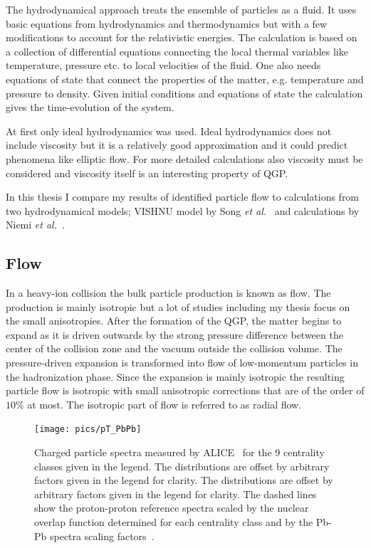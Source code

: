 
The hydrodynamical approach treats the ensemble of particles as a fluid. It uses  basic equations from hydrodynamics and thermodynamics but with a few modifications to account for the relativistic energies. The calculation is based on a collection of differential equations connecting the local thermal variables like temperature, pressure etc. to local velocities of the fluid. One also needs equations of state that connect the properties of the matter, e.g. temperature and pressure to density.  Given initial conditions and equations of state the calculation gives the time-evolution of the system.

At first only ideal hydrodynamics was used. Ideal hydrodynamics does not include viscosity but it is a relatively good approximation and it could predict phenomena like elliptic flow. For more detailed calculations also viscosity must be considered and viscosity itself is an interesting property of QGP.

In this thesis I compare my results of identified particle flow to calculations from two hydrodynamical models; VISHNU model by Song \emph{et al.}~\cite{Song:2013qma} and calculations by Niemi \emph{et al.}~\cite{Niemi:2012ry}.


\FloatBarrier
\pagebreak
\subsection{Flow}
In a heavy-ion collision the bulk particle production is known as flow. The production is mainly isotropic but a lot of studies including my thesis focus on the small anisotropies. After the formation of the QGP, the matter begins to expand as it is driven outwards by the strong pressure difference between the center of the collision zone and the vacuum outside the collision volume. The pressure-driven expansion is transformed into flow of low-momentum particles in the hadronization phase. Since the expansion is mainly isotropic the resulting particle flow is isotropic with small anisotropic corrections that are of the order of $10\%$ at most. The isotropic part of flow is referred to as radial flow. 

\begin{figure}[b!]
\centering
\texttt{[image: pics/pT\_PbPb]}
\caption[Charged particle spectra]{ Charged particle spectra measured by ALICE~\cite{PRL106032301} for the 9 centrality classes given in the legend. The distributions are offset by arbitrary factors given in the legend for clarity. The distributions are offset by arbitrary factors given in the legend for clarity. The dashed lines show the proton-proton reference spectra scaled by the nuclear overlap function determined for each centrality class and by the Pb-Pb spectra scaling factors~\cite{PRL106032301}.}
\label{fig:dndpt}
\end{figure}

